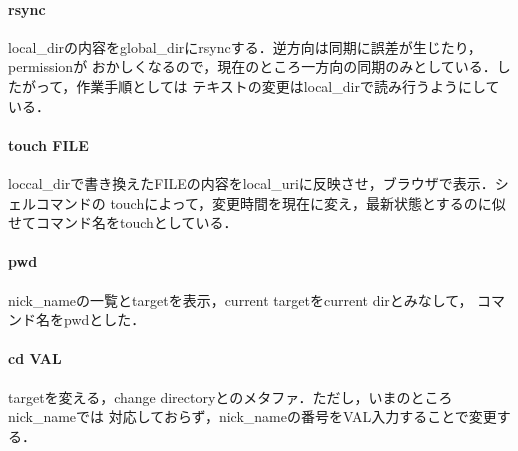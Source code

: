 \paragraph{rsync}
local\_dirの内容をglobal\_dirにrsyncする．逆方向は同期に誤差が生じたり，permissionが
おかしくなるので，現在のところ一方向の同期のみとしている．したがって，作業手順としては
テキストの変更はlocal\_dirで読み行うようにしている．

\paragraph{touch FILE}
loccal\_dirで書き換えたFILEの内容をlocal\_uriに反映させ，ブラウザで表示．シェルコマンドの
touchによって，変更時間を現在に変え，最新状態とするのに似せてコマンド名をtouchとしている．

\paragraph{pwd}
nick\_nameの一覧とtargetを表示，current targetをcurrent dirとみなして，
コマンド名をpwdとした．

\paragraph{cd VAL}
targetを変える，change directoryとのメタファ．ただし，いまのところnick\_nameでは
対応しておらず，nick\_nameの番号をVAL入力することで変更する．

